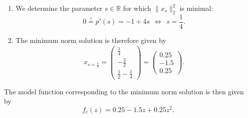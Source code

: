 {\begin{enumerate}
\begin{enumerate}
\begin{align*}
		=s^2+\frac{9}{4}+\frac{1}{4}-s+s^2
		=\frac{5}{2}-s+2s^2.
		\end{align*}
		\item 
		We determine the parameter $s\in\mathbb{R}$ for which $\|{x_s}\|_2^2$ is minimal: $$0\stackrel{!}{=} p'(s)=-1+4s\ \ \Leftrightarrow\ \ s=\frac{1}{4}.
		$$
		\item 
		The minimum norm solution is therefore given by $$
		x_{s=\frac{1}{4}}=\begin{pmatrix}\frac{1}{4}\\-\frac{3}{2}\\\frac{1}{2}-\frac{1}{4}\end{pmatrix}=\begin{pmatrix}0.25\\-1.5\\0.25\end{pmatrix}.
		$$
	\end{enumerate}
	The model function corresponding to the minimum norm solution is then given by 
	$$
	f_c(z)=0.25-1.5z+0.25z^2.
	$$
\end{enumerate}
}